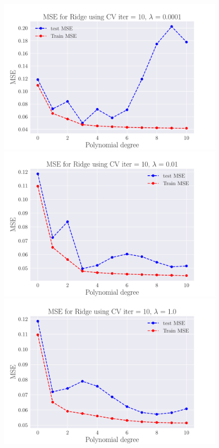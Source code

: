 \documentclass[reprint,english,notitlepage,aps,nobalancelastpage,nofootinbib]{revtex4-1}  %
\begin{document}
\begin{figure}[H]
	\includegraphics[width=\linewidth]{MSE_Ridge_n30_eps02_pol10_CV_re10_lam_0_0001.pdf}
	\endminipage\hfill
	\includegraphics[width=\linewidth]{MSE_Ridge_n30_eps02_pol10_CV_re10_lam_0_01.pdf}
	\endminipage\hfill
	\includegraphics[width=\linewidth]{MSE_Ridge_n30_eps02_pol10_CV_re10_lam_1_0.pdf}

\end{figure}
\end{document}
